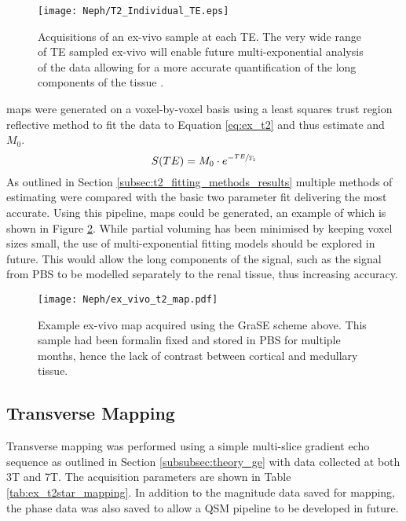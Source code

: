 \begin{figure}[H]
	\centering
	\texttt{[image: Neph/T2\_Individual\_TE.eps]}
	\caption{Acquisitions of an ex-vivo sample at each \ac{TE}. The very wide range of \ac{TE} sampled ex-vivo will enable future multi-exponential analysis of the data allowing for a more accurate quantification of the long \ttwo components of the tissue \cite{bjarnason_analyzennls_2010, sabouri_mr_2017}.}
	\label{fig:ex_t2_raw_data}	
\end{figure}

\ttwo maps were generated on a voxel-by-voxel basis using a least squares trust region reflective method to fit the data to Equation \eqref{eq:ex_t2} and thus estimate \ttwo and $M_0$. 
\begin{equation}
	S(TE) = M_0 \cdot e^{-\sfrac{TE}{T_2}}
	\label{eq:ex_t2}
\end{equation}
As outlined in Section \ref{subsec:t2_fitting_methods_results} multiple methods of estimating \ttwo were compared with the basic two parameter fit delivering the most accurate. Using this pipeline, \ttwo maps could be generated, an example of which is shown in Figure \ref{fig:ex_t2_map}. While partial voluming has been minimised by keeping voxel sizes small, the use of multi-exponential fitting models should be explored in future. This would allow the long \ttwo components of the signal, such as the signal from \ac{PBS} to be modelled separately to the renal tissue, thus increasing accuracy. 

\begin{figure}[H]
	\centering
	\texttt{[image: Neph/ex\_vivo\_t2\_map.pdf]}
	\caption{Example ex-vivo \ttwo map acquired using the \ac{GraSE} scheme above. This sample had been formalin fixed and stored in \ac{PBS} for multiple months, hence the lack of contrast between cortical and medullary tissue.}
	\label{fig:ex_t2_map}
\end{figure}

\subsection{Transverse \ttwostar Mapping}

Transverse \ttwostar mapping was performed using a simple multi-slice gradient echo sequence as outlined in Section \ref{subsubsec:theory_ge} with data collected at both 3T and 7T. The acquisition parameters are shown in Table \ref{tab:ex_t2star_mapping}. In addition to the magnitude data saved for \ttwostar mapping, the phase data was also saved to allow a \ac{QSM} pipeline to be developed in future.


